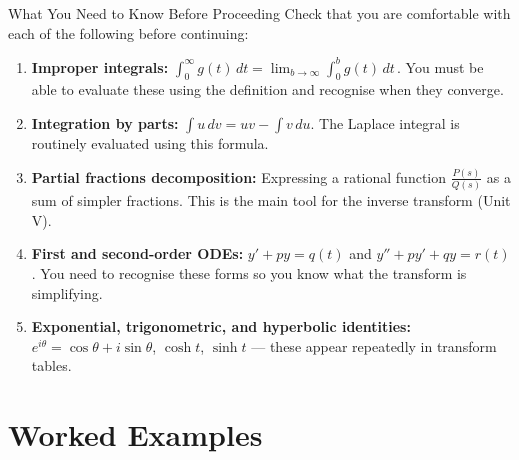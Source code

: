 \documentclass[12pt,a4paper]{article}
\begin{document}
\begin{infobox}{What You Need to Know Before Proceeding}
Check that you are comfortable with each of the following before continuing:

\begin{enumerate}[leftmargin=*]
  \item \textbf{Improper integrals:}
        $\displaystyle\int_0^\infty g(t)\,dt
         = \lim_{b \to \infty} \int_0^b g(t)\,dt$\,.
        You must be able to evaluate these using the definition and recognise
        when they converge.

  \item \textbf{Integration by parts:}
        $\displaystyle\int u\,dv = uv - \int v\,du$.
        The Laplace integral is routinely evaluated using this formula.

  \item \textbf{Partial fractions decomposition:}
        Expressing a rational function $\tfrac{P(s)}{Q(s)}$ as a sum of
        simpler fractions.  This is the main tool for the inverse transform
        (Unit V).

  \item \textbf{First and second-order ODEs:}
        $y' + py = q(t)$ and $y'' + py' + qy = r(t)$.
        You need to recognise these forms so you know what the transform is
        simplifying.

  \item \textbf{Exponential, trigonometric, and hyperbolic identities:}
        $e^{i\theta} = \cos\theta + i\sin\theta$, $\cosh t$, $\sinh t$ ---
        these appear repeatedly in transform tables.
\end{enumerate}
\end{infobox}

\section{Worked Examples}
\end{document}
